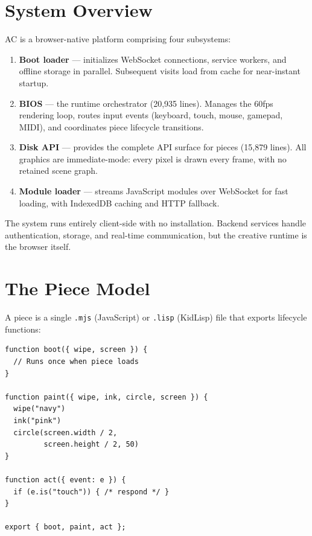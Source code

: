 \documentclass[manuscript,anonymous,review]{acmart}
\begin{document}
\section{System Overview}

AC is a browser-native platform comprising four subsystems:

\begin{enumerate}
  \item \textbf{Boot loader} --- initializes WebSocket connections, service workers, and offline storage in parallel. Subsequent visits load from cache for near-instant startup.
  \item \textbf{BIOS} --- the runtime orchestrator (20,935 lines). Manages the 60fps rendering loop, routes input events (keyboard, touch, mouse, gamepad, MIDI), and coordinates piece lifecycle transitions.
  \item \textbf{Disk API} --- provides the complete API surface for pieces (15,879 lines). All graphics are immediate-mode: every pixel is drawn every frame, with no retained scene graph.
  \item \textbf{Module loader} --- streams JavaScript modules over WebSocket for fast loading, with IndexedDB caching and HTTP fallback.
\end{enumerate}

The system runs entirely client-side with no installation. Backend services handle authentication, storage, and real-time communication, but the creative runtime is the browser itself.

\section{The Piece Model}

A piece is a single \texttt{.mjs} (JavaScript) or \texttt{.lisp} (KidLisp) file that exports lifecycle functions:

\begin{lstlisting}
function boot({ wipe, screen }) {
  // Runs once when piece loads
}

function paint({ wipe, ink, circle, screen }) {
  wipe("navy")
  ink("pink")
  circle(screen.width / 2,
         screen.height / 2, 50)
}

function act({ event: e }) {
  if (e.is("touch")) { /* respond */ }
}

export { boot, paint, act };
\end{lstlisting}
\end{document}

